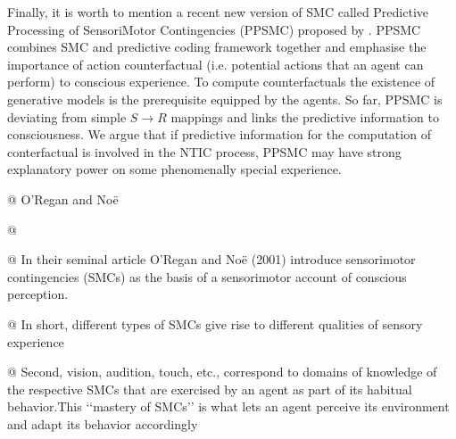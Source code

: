 \documentclass[utf8]{article}
\begin{document}
        Finally, it is worth to mention a recent new version of SMC called Predictive Processing of SensoriMotor Contingencies (PPSMC) proposed by \cite{seth2014predictive, seth2015presence}. PPSMC combines SMC and predictive coding framework together and emphasise the importance of action counterfactual (i.e. potential actions that an agent can perform) to conscious experience. To compute counterfactuals the existence of generative models is the prerequisite equipped by the agents. So far, PPSMC is deviating from simple $S\rightarrow{}R$ mappings and links the predictive information to consciousness. We argue that if predictive information for the computation of conterfactual is involved in the NTIC process, PPSMC may have strong explanatory power on some phenomenally special experience. 


		\begin{WritingMaterials} %

			@ O’Regan and Noë


			@ 

			@ In their seminal article O’Regan and Noë (2001) introduce sensorimotor contingencies (SMCs) as the basis of a sensorimotor account of conscious perception.

			@ In short, different types of SMCs give rise to different qualities of sensory experience

			@  Second, vision, audition, touch, etc., correspond to domains of knowledge of the respective SMCs that are exercised by an agent as part of its habitual behavior.This ‘‘mastery of SMCs’’ is what lets an agent perceive its environment and adapt its behavior accordingly


\end{WritingMaterials}
\end{document}

